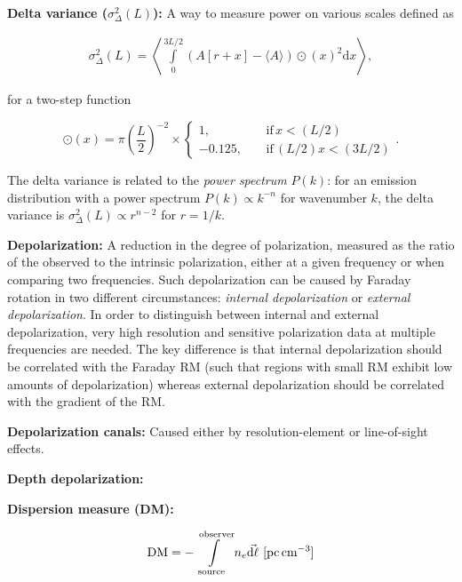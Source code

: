 \documentclass[a4paper,10pt]{article}
\begin{document}
{\noindent}\textbf{Delta variance ($\sigma_\Delta^2(L)$):} A way to measure power on various scales defined as

\begin{align*}
    \sigma_\Delta^2(L) = \left\langle \int\limits_0^{3L/2} {(A[r+x]-\langle A\rangle)\odot(x)}^2\mathrm{d}x \right\rangle,
\end{align*}

{\noindent}for a two-step function

\begin{equation*}
\odot(x) = \pi\left(\frac{L}{2}\right)^{-2} \times
\left\{
\begin{aligned}
1,          ~~~~~& \mathrm{if}\,x<(L/2) \\
-0.125, ~~~~~& \mathrm{if}\,(L/2)x<(3L/2)
\end{aligned}
\right.
.
\end{equation*}

{\noindent}The delta variance is related to the \textit{power spectrum} $P(k)$: for an emission distribution with a power spectrum $P(k)\propto k^{-n}$ for wavenumber $k$, the delta variance is $\sigma_\Delta^2(L)\propto r^{n-2}$ for $r=1/k$.

{\noindent}\textbf{Depolarization:} A reduction in the degree of polarization, measured as the ratio of the observed to the intrinsic polarization, either at a given frequency or when comparing two frequencies. Such depolarization can be caused by Faraday rotation in two different circumstances: \textit{internal depolarization} or \textit{external depolarization}. In order to distinguish between internal and external depolarization, very high resolution and sensitive polarization data at multiple frequencies are needed. The key difference is that internal depolarization should be correlated with the Faraday RM (such that regions with small RM exhibit low amounts of depolarization) whereas external depolarization should be correlated with the gradient of the RM.

{\noindent}\textbf{Depolarization canals:} Caused either by resolution-element or line-of-sight effects.

{\noindent}\textbf{Depth depolarization:}

{\noindent}\textbf{Dispersion measure (DM):}

\begin{align*}
    {\rm DM} = -\int\limits_\mathrm{source}^\mathrm{observer} n_e\vec{{\rm d}\ell} ~ [{\rm pc\,cm^{-3}}]
\end{align*}
\end{document}
